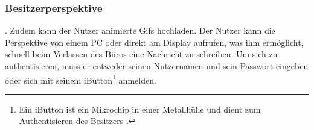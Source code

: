 \subsubsection{Besitzerperspektive}
. Zudem kann der Nutzer animierte Gifs hochladen.
Der Nutzer kann die Perspektive von einem PC oder direkt am Display aufrufen, was ihm ermöglicht, schnell beim Verlassen des Büros eine Nachricht zu schreiben. Um sich zu authentisieren, muss er entweder seinen Nutzernamen und sein Passwort eingeben oder sich mit seinem iButton\footnote{Ein iButton ist ein Mikrochip in einer Metallhülle und dient \bspw zum Authentisieren des Besitzers \cite{iButton:website}.} anmelden.
